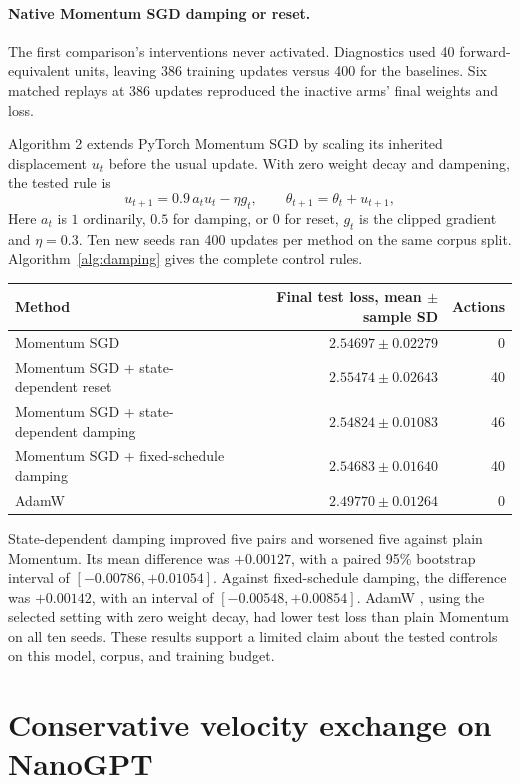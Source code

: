 \documentclass[10pt,letterpaper]{article}
\begin{document}
\paragraph{Native Momentum SGD damping or reset.}
The first comparison's interventions never activated. Diagnostics used 40 forward-equivalent units, leaving 386 training updates versus 400 for the baselines. Six matched replays at 386 updates reproduced the inactive arms' final weights and loss.

Algorithm 2 extends PyTorch Momentum SGD \cite{pytorchsgd} by scaling its inherited displacement \(u_t\) before the usual update. With zero weight decay and dampening, the tested rule is
\[
u_{t+1}=0.9\,a_tu_t-\eta g_t,\qquad \theta_{t+1}=\theta_t+u_{t+1},
\]
Here \(a_t\) is \(1\) ordinarily, \(0.5\) for damping, or \(0\) for reset, \(g_t\) is the clipped gradient and \(\eta=0.3\). Ten new seeds ran 400 updates per method on the same corpus split. Algorithm~\ref{alg:damping} gives the complete control rules.

\begin{center}
\begin{tabular}{@{}lrr@{}}
\toprule
Method & Final test loss, mean \(\pm\) sample SD & Actions\\
\midrule
Momentum SGD & \(2.54697\pm0.02279\)&0\\
Momentum SGD + state-dependent reset & \(2.55474\pm0.02643\)&40\\
Momentum SGD + state-dependent damping & \(2.54824\pm0.01083\)&46\\
Momentum SGD + fixed-schedule damping & \(2.54683\pm0.01640\)&40\\
AdamW & \(2.49770\pm0.01264\)&0\\
\bottomrule
\end{tabular}
\end{center}
State-dependent damping improved five pairs and worsened five against plain Momentum. Its mean difference was \(+0.00127\), with a paired 95\% bootstrap interval of \([-0.00786,+0.01054]\). Against fixed-schedule damping, the difference was \(+0.00142\), with an interval of \([-0.00548,+0.00854]\). AdamW \cite{adamw}, using the selected setting with zero weight decay, had lower test loss than plain Momentum on all ten seeds. These results support a limited claim about the tested controls on this model, corpus, and training budget.

\clearpage
\section{Conservative velocity exchange on NanoGPT}
\label{sec:exchange}
\end{document}
